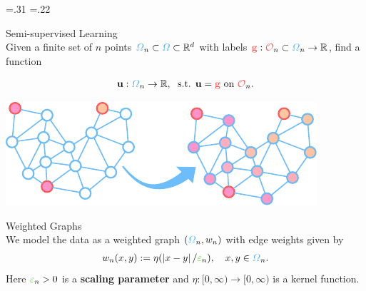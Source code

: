 \newdimen\topWidth
\newdimen\topHeight
\newdimen\seplineHeight
\topWidth=.31\textwidth
\topHeight=.22\textheight
\seplineHeight=60pt
%
%
\begin{minipage}[t][\topHeight][t]{\topWidth}%
{\color{BaseDarkColor} Semi-supervised Learning}\\%
Given a finite set of $n$ points $\domain_n\nc\subset\domain\subset\R^d$ with labels $\color{grape}\vec g\nc:\constr_n\nc\subset\domain_n\rightarrow\R$, find a function
\begin{block}{}%
\belowdisplayskip=0pt%
\abovedisplayskip=0pt%
\begin{align*}%
\vec u:\domain_n\nc\to\R,\;\text{ s.t. }\vec u=\color{grape}\vec g \nc\text{ on } \constr_n\nc.
\end{align*}%
\end{block}%
%
\begin{center}%
\includegraphics[width=.8\textwidth]{atelier/SSL.pdf}%
\end{center}%
%
{\noindent\color{BaseDarkColor}%
Weighted Graphs}\\%
We model the data as a \alert{weighted graph} $(\domain_n,w_n)$ with edge weights given by
\begin{align*}
w_n(x,y):=
\eta(\abs{x-y}/\scaling_n),\quad x,y\in\domain_n\nc.
\end{align*}
Here $\scaling_n\nc>0$ is a \color{apple}\textbf{scaling parameter}\nc{} and \linebreak $\eta:[0,\infty)\rightarrow[0,\infty)$ is a kernel function.
%
\end{minipage}%
%
%
\hfill%
%
%
